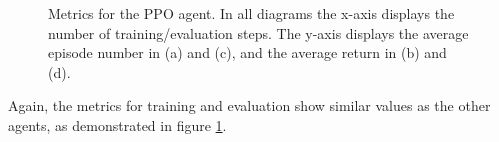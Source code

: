 \begin{figure}[H]
	\qquad
	\caption[PPO Training]{Metrics for the PPO agent. In all diagrams the x-axis displays the number of training/evaluation steps. The y-axis displays the average episode number in (a) and (c), and the average return in (b) and (d).}	
	\label{fig:ppo_train}
\end{figure}

Again, the metrics for training and evaluation show similar values as the other agents, as demonstrated in figure \ref{fig:ppo_train}.